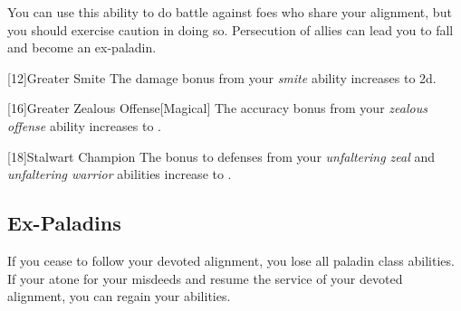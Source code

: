         You can use this ability to do battle against foes who share your alignment, but you should exercise caution in doing so.
        Persecution of allies can lead you to fall and become an ex-paladin.

        [12]{Greater Smite} The damage bonus from your \textit{smite} ability increases to \plus2d.

        [16]{Greater Zealous Offense}[Magical]
        The accuracy bonus from your \textit{zealous offense} ability increases to .

        [18]{Stalwart Champion}
        The bonus to defenses from your \textit{unfaltering zeal} and \textit{unfaltering warrior} abilities increase to .


    \subsection{Ex-Paladins}
        If you cease to follow your devoted alignment, you lose all  paladin class abilities.
        If your atone for your misdeeds and resume the service of your devoted alignment, you can regain your abilities.

\newpage
